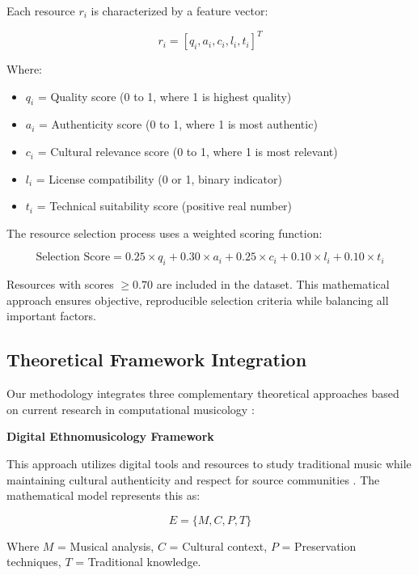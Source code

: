 \documentclass[12pt,a4paper]{article}
\begin{document}
Each resource $r_i$ is characterized by a feature vector:

\begin{equation}
r_i = [q_i, a_i, c_i, l_i, t_i]^T
\end{equation}

Where:
\begin{itemize}
\item $q_i$ = Quality score (0 to 1, where 1 is highest quality)
\item $a_i$ = Authenticity score (0 to 1, where 1 is most authentic)
\item $c_i$ = Cultural relevance score (0 to 1, where 1 is most relevant)
\item $l_i$ = License compatibility (0 or 1, binary indicator)
\item $t_i$ = Technical suitability score (positive real number)
\end{itemize}

The resource selection process uses a weighted scoring function:

\begin{equation}
\text{Selection Score} = 0.25 \times q_i + 0.30 \times a_i + 0.25 \times c_i + 0.10 \times l_i + 0.10 \times t_i
\end{equation}

Resources with scores $\geq 0.70$ are included in the dataset. This mathematical approach ensures objective, reproducible selection criteria while balancing all important factors.

\subsection{Theoretical Framework Integration}

Our methodology integrates three complementary theoretical approaches based on current research in computational musicology \citep{huron2006sweet, temperley2007music}:

\textbf{Digital Ethnomusicology Framework}

This approach utilizes digital tools and resources to study traditional music while maintaining cultural authenticity and respect for source communities \citep{seeger2004traditional, post2006ethnomusicology}. The mathematical model represents this as:

\begin{equation}
E = \{M, C, P, T\}
\end{equation}

Where $M$ = Musical analysis, $C$ = Cultural context, $P$ = Preservation techniques, $T$ = Traditional knowledge.
\end{document}
